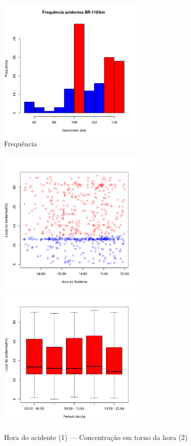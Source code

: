 \quad \quad
\begin{figure}[h]
	\centering
	\caption{ Frequência}
	\includegraphics[width=7cm,height=7cm]{Figuras/Preprocess/br110_3.png}
\end{figure}

\pagebreak

\begin{figure}[h]
	\caption{Hora do acidente (1) --- Concentração em torno da hora (2) }
	\includegraphics[width=7cm,height=7cm]{Figuras/Preprocess/br116_1.png}
	\includegraphics[width=7cm,height=7cm]{Figuras/Preprocess/br116_2.png}

\end{figure}

